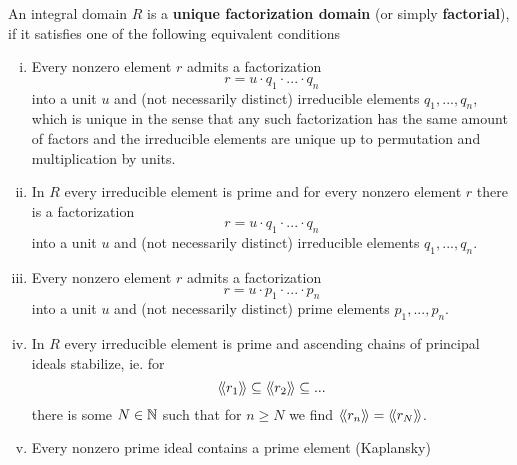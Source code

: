 	\begin{definition}
		An integral domain $R$ is a \textbf{unique factorization domain} (or simply \textbf{factorial}), if it satisfies one of the following equivalent conditions
		\begin{enumerate}[(i)]
			\item{
				Every nonzero element $r$ admits a factorization
				\begin{equation*}
					r = u\cdot q_1\cdot ...\cdot q_n
				\end{equation*}
				into a unit $u$ and (not necessarily distinct) irreducible elements $q_1,...,q_n$, which is unique in the sense that any such factorization has the same amount of factors and the irreducible elements are unique up to permutation and multiplication by units.
			}
			\item{
				In $R$ every irreducible element is prime and for every nonzero element $r$ there is a factorization
				\begin{equation*}
					r = u\cdot q_1\cdot ...\cdot q_n
				\end{equation*}
				into a unit $u$ and (not necessarily distinct) irreducible elements $q_1,...,q_n$.
			}
			\item{
				Every nonzero element $r$ admits a factorization
				\begin{equation*}
					r = u\cdot p_1\cdot ... \cdot p_n
				\end{equation*}
				into a unit $u$ and (not necessarily distinct) prime elements $p_1,...,p_n$.
			}
			\item{
				In $R$ every irreducible element is prime and ascending chains of principal ideals stabilize, ie. for
				\begin{equation*}
					\langle\!\langle r_1 \rangle\!\rangle \subseteq \langle\!\langle r_2 \rangle\!\rangle \subseteq ...
				\end{equation*}
				there is some $N \in \mathbb{N}$ such that for $n \geq N$ we find $\langle\!\langle r_n \rangle\!\rangle = \langle\!\langle r_N \rangle\!\rangle$.
			}
			\item{
				Every nonzero prime ideal contains a prime element (Kaplansky)
			}
		\end{enumerate}
	\end{definition}
